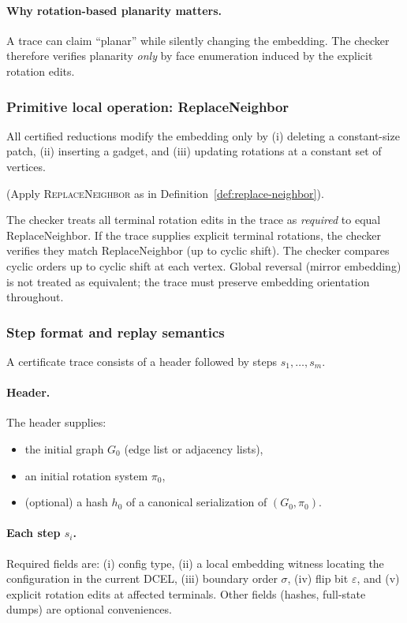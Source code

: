 \documentclass[12pt]{article}
\theoremstyle{definition}
\begin{document}
\paragraph{Why rotation-based planarity matters.}
A trace can claim “planar” while silently changing the embedding. The checker therefore verifies planarity
\emph{only} by face enumeration induced by the explicit rotation edits.

\subsubsection{Primitive local operation: ReplaceNeighbor}
\label{subsubsec:checker-replaceneighbor}

All certified reductions modify the embedding only by (i) deleting a constant-size patch, (ii) inserting a gadget,
and (iii) updating rotations at a constant set of vertices.


(Apply \textsc{ReplaceNeighbor} as in Definition~\ref{def:replace-neighbor}).


The checker treats all terminal rotation edits in the trace as \emph{required} to equal ReplaceNeighbor.
If the trace supplies explicit terminal rotations, the checker verifies they match ReplaceNeighbor (up to cyclic shift). The checker compares cyclic orders up to cyclic shift at each vertex. Global reversal (mirror embedding) is not treated as equivalent; the trace must preserve embedding orientation throughout.

\subsubsection{Step format and replay semantics}
\label{subsubsec:checker-step-semantics}

A certificate trace consists of a header followed by steps $s_1,\dots,s_m$.

\paragraph{Header.}
The header supplies:
\begin{itemize}
\item the initial graph $G_0$ (edge list or adjacency lists),
\item an initial rotation system $\pi_0$,
\item (optional) a hash $h_0$ of a canonical serialization of $(G_0,\pi_0)$.
\end{itemize}

\paragraph{Each step $s_i$.}
Required fields are: (i) config type, (ii) a local embedding witness locating the configuration in the current DCEL, (iii) boundary order $\sigma$, (iv) flip bit $\varepsilon$, and (v) explicit rotation edits at affected terminals. Other fields (hashes, full-state dumps) are optional conveniences.
\end{document}
